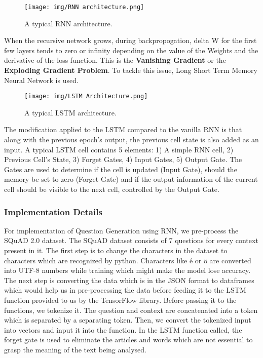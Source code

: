 \documentclass[oneside,a4paper]{article}
\begin{document}
\begin{figure}[H]
    \centering
    \texttt{[image: img/RNN architecture.png]}
    \caption{A typical RNN architecture.}
    \label{fig:rnn}
\end{figure}

When the recursive network grows, during backpropogation, delta W for the first few layers tends to  zero or infinity depending on the value of the Weights and the derivative of the loss function. This is the \textbf{Vanishing Gradient} or the \textbf{Exploding Gradient Problem}. To tackle this issue, Long Short Term Memory Neural Network is used. 

\begin{figure}[H]
    \centering
    \texttt{[image: img/LSTM Architecture.png]}
    \caption{A typical LSTM architecture.}
    \label{fig:rnn}
\end{figure}

The modification applied to the LSTM compared to the vanilla RNN is that along with the previous epoch's output, the previous cell state is also added as an input. A typical LSTM cell contains 5 elements: 1) A simple RNN cell, 2) Previous Cell's State, 3) Forget Gates, 4) Input Gates, 5) Output Gate. The Gates are used to determine if the cell is updated (Input Gate), should the memory be set to zero (Forget Gate) and if the output information of the current cell should be visible to the next cell, controlled by the Output Gate.

\subsubsection{Implementation Details}
For implementation of Question Generation using RNN, we pre-process the SQuAD 2.0 dataset. The SQuAD dataset consists of 7 questions for every context present in it. The first step is to change the characters in the dataset to characters which are recognized by python. Characters like \'e or \"o are converted into UTF-8 numbers while training which might make the model lose accuracy. The next step is converting the data which is in the JSON format to dataframes which would help us in pre-processing the data before feeding it to the LSTM function provided to us by the TensorFlow library. Before passing it to the functions, we tokenize it. The question and context are concatenated into a token which is separated by a separating token. Then, we convert the tokenized input into vectors and input it into the function. In the LSTM function called, the forget gate is used to eliminate the articles and words which are not essential to grasp the meaning of the text being analysed.
\end{document}
